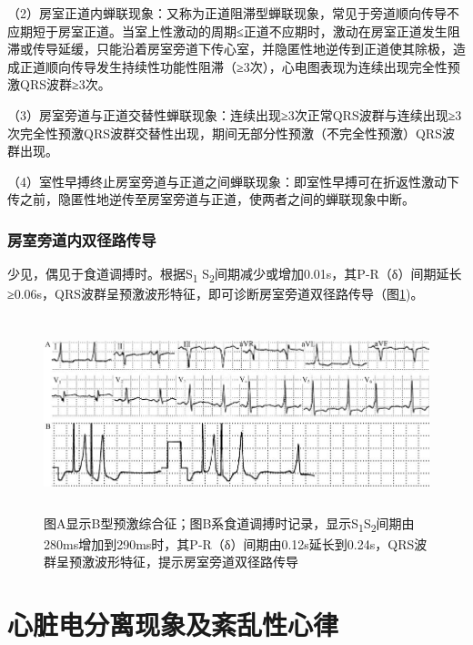 （2）房室正道内蝉联现象：又称为正道阻滞型蝉联现象，常见于旁道顺向传导不应期短于房室正道。当室上性激动的周期≤正道不应期时，激动在房室正道发生阻滞或传导延缓，只能沿着房室旁道下传心室，并隐匿性地逆传到正道使其除极，造成正道顺向传导发生持续性功能性阻滞（≥3次），心电图表现为连续出现完全性预激QRS波群≥3次。

（3）房室旁道与正道交替性蝉联现象：连续出现≥3次正常QRS波群与连续出现≥3次完全性预激QRS波群交替性出现，期间无部分性预激（不完全性预激）QRS波群出现。

（4）室性早搏终止房室旁道与正道之间蝉联现象：即室性早搏可在折返性激动下传之前，隐匿性地逆传至房室旁道与正道，使两者之间的蝉联现象中断。

\protect\hypertarget{text00036.htmlux5cux23subid430}{}{}

\subsection{房室旁道内双径路传导}

少见，偶见于食道调搏时。根据S\textsubscript{1} S\textsubscript{2}间期减少或增加0.01s，其P-R（δ）间期延长≥0.06s，QRS波群呈预激波形特征，即可诊断房室旁道双径路传导（图\ref{fig29-11})。

\begin{figure}[!htbp]
 \centering
 \includegraphics[width=5.88542in,height=2.22917in]{./images/Image00495.jpg}
 \captionsetup{justification=centering}
 \caption{图A显示B型预激综合征；图B系食道调搏时记录，显示S\textsubscript{1}S\textsubscript{2}间期由280ms增加到290ms时，其P-R（δ）间期由0.12s延长到0.24s，QRS波群呈预激波形特征，提示房室旁道双径路传导}
 \label{fig29-11}
  \end{figure} 


\protect\hypertarget{text00037.html}{}{}

\protect\hypertarget{text00037.htmlux5cux23chapter37}{}{}

\chapter{心脏电分离现象及紊乱性心律}

